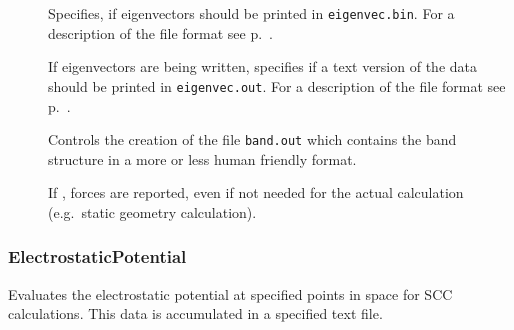 \begin{description}
\item[] Specifies, if eigenvectors should be printed in
  \verb|eigenvec.bin|. For a description of the file format see
  p.~.

\item[] If eigenvectors are being written, specifies if a
  text version of the data should be printed in \verb|eigenvec.out|. For a
  description of the file format see p.~.

\item[]  Controls the creation of the file \verb|band.out|
  which contains the band structure in a more or less human friendly format.

\item[] If , forces are reported, even if not needed
  for the actual calculation (e.g.\ static geometry calculation).

\end{description}

\subsubsection{ElectrostaticPotential}
\label{sec:dftbp.ESP}

Evaluates the electrostatic potential at specified points in space for SCC
calculations. This data is accumulated in a specified text file.

